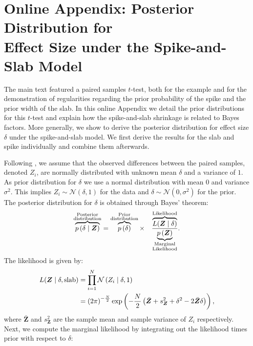 \documentclass[a4paper]{article}
\newcommand{\DON}[1]{\todo[inline, color=white]{Don: #1}}
\newcommand{\shypo}[1]{%
	\ifnum#1>0%
		\mathrm{slab}
	\else%
		\mathrm{spike}
	\fi%
}
\newcommand{\model}{\mathcal{M}}
\newcommand{\data}{\mathrm{data}}%
\newcommand{\dataZ}	{\bm{Z}}
\newcommand{\dataZi}{Z_i}
\newcommand{\meanZ}	{\bar{\dataZ}}
\newcommand{\varZ}	{s_{\dataZ}^2}
\newcommand{\probp}[1]{p\left(#1\right)}
\newcommand{\lik}{L}
\newcommand{\dnorm}[2]{\mathcal{N}\left(#1, #2\right)}
\newcommand{\dnormc}[3]{\mathcal{N}\left(#1 \mid #2, #3\right)}
\newenvironment{revision}{\color{teal}}{\color{black}}
\begin{document}
\newpage
\appendix
\begin{revision}%

\section*{Online Appendix: Posterior Distribution for \\Effect Size under the Spike-and-Slab Model}


The main text featured a paired samples $t$-test, both for the example and for the demonstration of regularities regarding the prior probability of the spike and the prior width of the slab. In this online Appendix we detail the prior distributions for this $t$-test and explain how the spike-and-slab shrinkage is related to Bayes factors. More generally, we show to derive the posterior distribution for effect size $\delta$ under the spike-and-slab model. We first derive the results for the slab and spike individually and combine them afterwards. 

Following \textcite{RouderEtAl2018PBR}, we assume that the observed differences between the paired samples, denoted $\dataZi$, are normally distributed with unknown mean $\delta$ and a variance of $1$.
As prior distribution for $\delta$ we use a normal distribution with mean 0 and variance $\sigma^2$.
This implies $\dataZi\sim \dnorm{\delta}{1}$ for the data and $\delta\sim\dnorm{0}{\sigma^2}$ for the prior. The posterior distribution for $\delta$ is obtained through Bayes' theorem:
\begin{align*}%
\overbrace{\probp{\delta \mid \dataZ}}^{\substack{\text{Posterior}\\\text{distribution}}}
= 
\overbrace{\probp{\delta}}^{\substack{\text{Prior}\\ \text{distribution}}}
\times \quad
\frac{
	\overbrace{\lik(\dataZ \mid \delta)}^{\text{Likelihood}}
}{
	\underbrace{\probp{\dataZ}}_{\substack{\text{Marginal}\\ \text{Likelihood}}}
}.
\end{align*}
The likelihood is given by:
\begin{align*}
	\lik(\dataZ \mid \delta, \shypo{1}) &= \prod_{i=1}^{N} \dnormc{\dataZi}{\delta}{1}\\
							 &= \left(2\pi\right)^{-\frac{N}{2}}
							 \exp\left(-\frac{N}{2}\left(\meanZ + \varZ + \delta^2 -2\meanZ\delta\right)\right),
\end{align*}
where $\meanZ$ and $\varZ$ are the sample mean and sample variance of $\dataZi$ respectively. Next, we compute the marginal likelihood by integrating out the likelihood times prior with respect to $\delta$:


\end{revision}
\end{document}
